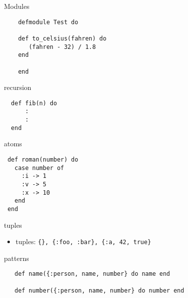 \begin{frame}[fragile]{Modules}

  \begin{verbatim}
    defmodule Test do

    def to_celsius(fahren) do
       (fahren - 32) / 1.8
    end

    end
  \end{verbatim}

\end{frame}

\begin{frame}[fragile]{recursion}

\begin{verbatim}
  def fib(n) do 
      :
      :
  end
\end{verbatim}

\end{frame}

\begin{frame}[fragile]{atoms}

\begin{verbatim}
 def roman(number) do 
   case number of
     :i -> 1
     :v -> 5
     :x -> 10
   end
 end   
\end{verbatim}
\end{frame}


\begin{frame}{tuples}

 \begin{itemize}
  \pause \item {tuples:} {\tt \{\}, \{:foo, :bar\}, \{:a, 42, true\}}
 \end{itemize}

\end{frame}


\begin{frame}[fragile]{patterns}

\begin{verbatim}
   def name({:person, name, number} do name end

   def number({:person, name, number} do number end
\end{verbatim}

\end{frame}




